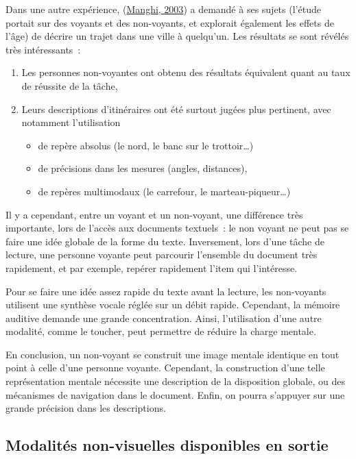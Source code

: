 \documentclass[
]{book}
\providecommand{\tightlist}{%
  \setlength{\itemsep}{0pt}\setlength{\parskip}{0pt}}
\begin{document}
Dans une autre expérience, (\protect\hyperlink{ref-manghi2003composantes}{Manghi, 2003}) a demandé à ses sujets
(l'étude portait sur des voyants et des non-voyants, et explorait également les
effets de l'âge) de décrire un trajet dans une ville à quelqu'un. Les résultats
se sont révélés très intéressants~:

\begin{enumerate}
\def\labelenumi{\arabic{enumi}.}
\tightlist
\item
  Les personnes non-voyantes ont obtenu des
  résultats équivalent quant au taux de réussite de la tâche,
\item
  Leurs descriptions d'itinéraires ont été surtout
  jugées plus pertinent, avec notamment l'utilisation

  \begin{itemize}
  \tightlist
  \item
    de repère absolus (le nord, le banc sur le
    trottoir\ldots)
  \item
    de précisions dans les mesures (angles,
    distances),
  \item
    de repères multimodaux (le carrefour, le
    marteau-piqueur\ldots)
  \end{itemize}
\end{enumerate}

Il y a cependant, entre un voyant et un non-voyant, une différence très
importante, lors de l'accès aux documents textuels~: le non voyant ne peut pas
se faire une idée globale de la forme du texte. Inversement, lors d'une tâche
de lecture, une personne voyante peut parcourir l'ensemble du document très
rapidement, et par exemple, repérer rapidement l'item qui l'intéresse.

Pour se faire une idée assez rapide du texte avant la lecture, les
non-voyants utilisent une synthèse vocale réglée sur un débit rapide.
Cependant, la mémoire auditive demande une grande concentration. Ainsi,
l'utilisation d'une autre modalité, comme le toucher, peut permettre de
réduire la charge mentale.

En conclusion, un non-voyant se construit une image mentale identique en
tout point à celle d'une personne voyante. Cependant, la construction d'une
telle représentation mentale nécessite une description de la disposition
globale, ou des mécanismes de navigation dans le document. Enfin, on pourra
s'appuyer sur une grande précision dans les descriptions.

\hypertarget{modalituxe9s-non-visuelles-disponibles-en-sortie}{%
\subsection{Modalités non-visuelles disponibles en sortie}\label{modalituxe9s-non-visuelles-disponibles-en-sortie}}
\end{document}
